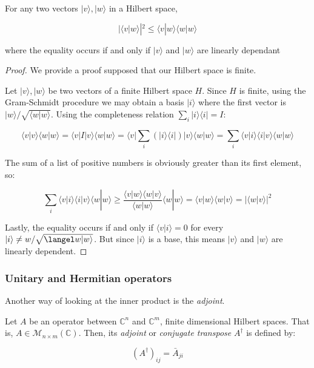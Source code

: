 \begin{corollary}
	For any two vectors $|v\rangle, |w\rangle$ in a Hilbert space,
	
	$$|\langle v|w\rangle|^2 \leq \langle v|w\rangle\langle w|w\rangle$$
	
	where the equality occurs if and only if $|v\rangle$ and $|w\rangle$ are linearly dependant
\end{corollary}
\begin{proof} 
	
	We provide a proof supposed that our Hilbert space is finite.
	
	Let $|v\rangle, |w\rangle$ be two vectors of a finite Hilbert space $H$. Since $H$ is finite, using the Gram-Schmidt procedure we may obtain a basis $|i\rangle$ where the first vector is $|w\rangle / \sqrt{\langle w|w\rangle}$. Using the completeness relation $\sum_i |i\rangle \langle i| = I$:
	
	$$\langle v|v\rangle \langle w|w\rangle = \langle v|I|v\rangle \langle w|w\rangle = \langle v| \sum_i (|i\rangle \langle i|) |v\rangle \langle w|w\rangle = \sum_i \langle v|i\rangle \langle i|v\rangle \langle w|w\rangle $$
	
	The sum of a list of positive numbers is obviously greater than its first element, so:
	
	$$ \sum_i \langle v|i\rangle \langle i|v\rangle \langle w|w\rangle \geq  \frac{\langle v|w\rangle \langle w|v\rangle}{\langle w|w\rangle} \langle w|w\rangle = \langle v|w\rangle \langle w|v\rangle  = | \langle w|v\rangle |^2 $$
	
	Lastly, the equality occurs if and only if $\langle v|i\rangle = 0$ for every $|i\rangle \neq w / \sqrt{\langel w|w\rangle}$. But since $|i\rangle$ is a base, this means $|v\rangle$ and $|w\rangle$ are linearly dependent.
	
\end{proof}


\subsubsection{Unitary and Hermitian operators}


Another way of looking at the inner product is the \emph{adjoint}.

\begin{definition}
	Let $A$ be an operator between $\mathds{C}^n$ and $\mathds{C}^m$, finite dimensional Hilbert spaces. That is, $A \in \mathcal{M}_{n{\times}m}(\mathds{C})$. Then, its \emph{adjoint} or \emph{conjugate transpose} $A^\dagger$ is defined by:
	
	$$ (A^\dagger)_{ij} = \bar A_{ji} $$
\end{definition}

